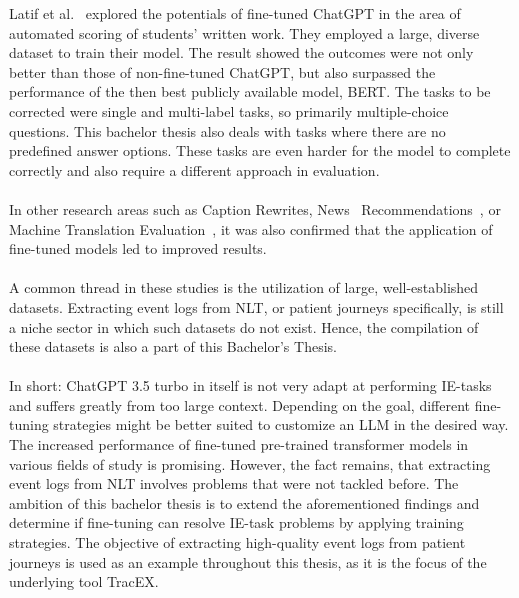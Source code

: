 \newpage
Latif et al.~\cite{latif_fine-tuning_2024} explored the potentials of fine-tuned ChatGPT in the area of automated scoring of students' written work. They employed a large, diverse dataset to train their model. The result showed the outcomes were not only better than those of non-fine-tuned ChatGPT, but also surpassed the performance of the then best publicly available model, BERT. The tasks to be corrected were single and multi-label tasks, so primarily multiple-choice questions. This bachelor thesis also deals with tasks where there are no predefined answer options. These tasks are even harder for the model to complete correctly and also require a different approach in evaluation.\\\\
In other research areas such as Caption Rewrites, News~\cite{gladkoff_predictive_2023} Recommendations~\cite{li_exploring_2023}, or Machine Translation Evaluation~\cite{wang_mitigating_2023}, it was also confirmed that the application of fine-tuned models led to improved results.\\\\
A common thread in these studies is the utilization of large, well-established datasets. Extracting event logs from NLT, or patient journeys specifically, is still a niche sector in which such datasets do not exist. Hence, the compilation of these datasets is also a part of this Bachelor's Thesis.\\\\
In short: ChatGPT 3.5 turbo in itself is not very adapt at performing IE-tasks and suffers greatly from too large context. Depending on the goal, different fine-tuning strategies might be better suited to customize an LLM in the desired way. The increased performance of fine-tuned pre-trained transformer models in various fields of study is promising. However, the fact remains, that extracting event logs from NLT involves problems that were not tackled before. The ambition of this bachelor thesis is to extend the aforementioned findings and determine if fine-tuning can resolve IE-task problems by applying training strategies. The objective of extracting high-quality event logs from patient journeys is used as an example throughout this thesis, as it is the focus of the underlying tool TracEX.